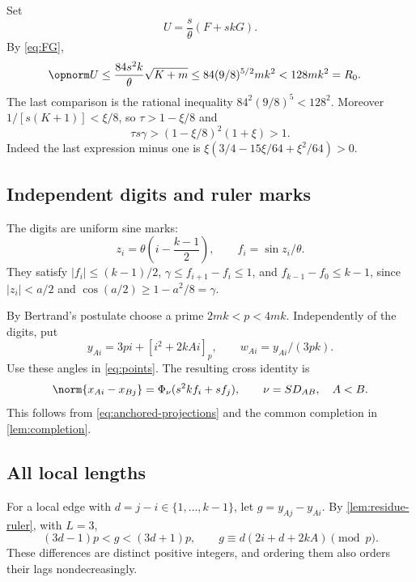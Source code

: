 Set
\[
 U=\frac{s}{\theta}(F+skG).
\]
By \eqref{eq:FG},
\begin{align*}
 \opnorm U&\le\frac{84s^2k}{\theta}\sqrt{K+m}
 \le84(9/8)^{5/2}mk^2<128mk^2=R_0.
\end{align*}
The last comparison is the rational inequality $84^2(9/8)^5<128^2$.
Moreover $1/[s(K+1)]<\xi/8$, so $\tau>1-\xi/8$ and
\begin{equation}\label{eq:epsilon-slack}
 \tau s\gamma>(1-\xi/8)^2(1+\xi)>1.
\end{equation}
Indeed the last expression minus one is
$\xi(3/4-15\xi/64+\xi^2/64)>0$.

\subsection{Independent digits and ruler marks}

The digits are uniform sine marks:
\[
 z_i=\theta\left(i-\frac{k-1}{2}\right),\qquad f_i=\sin z_i/\theta.
\]
They satisfy $|f_i|\le(k-1)/2$, $\gamma\le f_{i+1}-f_i\le1$, and
$f_{k-1}-f_0\le k-1$, since $|z_i|<a/2$ and
$\cos(a/2)\ge1-a^2/8=\gamma$.

By Bertrand's postulate choose a prime $2mk<p<4mk$. Independently of the
digits, put
\begin{equation}\label{eq:ruler-epsilon}
 y_{Ai}=3pi+[i^2+2kAi]_p,\qquad w_{Ai}=y_{Ai}/(3pk).
\end{equation}
Use these angles in \eqref{eq:points}. The resulting cross identity is
\begin{equation}\label{eq:epsilon-cross}
 \norm{x_{Ai}-x_{Bj}}=\Phi_\nu(s^2kf_i+sf_j),\qquad \nu=SD_{AB},\quad A<B.
\end{equation}
This follows from \eqref{eq:anchored-projections} and the common completion
in \cref{lem:completion}.

\subsection{All local lengths}

For a local edge with $d=j-i\in\{1,\ldots,k-1\}$, let $g=y_{Aj}-y_{Ai}$.
By \cref{lem:residue-ruler}, with $L=3$,
\begin{equation}\label{eq:ruler-windows}
 (3d-1)p<g<(3d+1)p,\qquad
 g\equiv d(2i+d+2kA)\pmod p.
\end{equation}
These differences are distinct positive integers, and ordering them also
orders their lags nondecreasingly.


